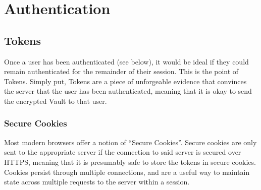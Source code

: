 \documentclass{article}
\begin{document}
\section{Authentication}

\subsection{Tokens}
\label{sub:tokens}
\par Once a user has been authenticated (see below), it would be ideal if they could remain authenticated for the remainder of their session. This is the point of Tokens. Simply put, Tokens are a piece of unforgeable evidence that convinces the server that the user has been authenticated, meaning that it is okay to send the encrypted Vault to that user.

\subsubsection{Secure Cookies}
\label{ssub:secure_cookies}
\par Most modern browsers offer a notion of ``Secure Cookies''. Secure cookies are only sent to the appropriate server if the connection to said server is secured over HTTPS, meaning that it is presumably safe to store the tokens in secure cookies. Cookies persist through multiple connections, and are a useful way to maintain state across multiple requests to the server within a session.
\end{document}
